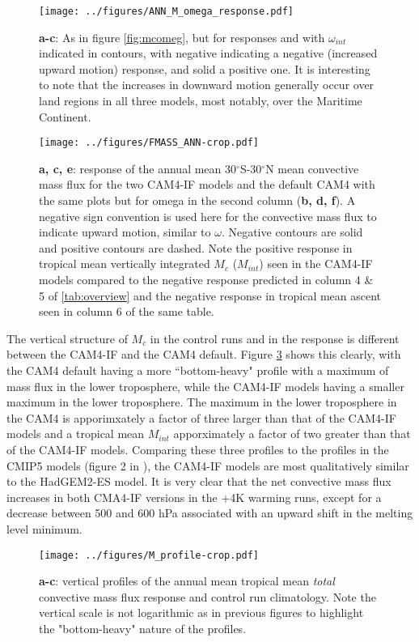 \documentclass[letterpaper,12pt,titlepage,oneside,final]{book}
\begin{document}
\begin{figure}[H]
\centering
\noindent\texttt{[image: ../figures/ANN\_M\_omega\_response.pdf]}\hfill
\caption{\textbf{a-c}: As in figure \ref{fig:mcomeg}, but for responses and with $\omega_{int}$ indicated in contours, with negative indicating a negative (increased upward motion) response, and solid a positive one. It is interesting to note that the increases in downward motion generally occur over land regions in all three models, most notably, over the Maritime Continent.}
\label{fig:mcomegres}
\end{figure}
\begin{figure}[H]
\centering
\noindent\texttt{[image: ../figures/FMASS\_ANN-crop.pdf]}\hfill
\caption{\textbf{a, c, e}: response of the annual mean 30$^\circ$S-30$^\circ$N mean convective mass flux for the two CAM4-IF models and the default CAM4 with the same plots but for omega in the second column (\textbf{b, d, f}). A negative sign convention is used here for the convective mass flux to indicate upward motion, similar to $\omega$. Negative contours are solid and positive contours are dashed. Note the positive response in tropical mean vertically integrated $M_c$ ($M_{int}$) seen in the CAM4-IF models compared to the negative response predicted in column 4 \& 5 of \ref{tab:overview} and the negative response in tropical mean ascent seen in column 6 of the same table. }
\label{fig:Mc}
\end{figure}
The vertical structure of $M_{c}$ in the control runs and in the response is different between the CAM4-IF and the CAM4 default. Figure \ref{fig:mprofs} shows this clearly, with the CAM4 default having a more ``bottom-heavy" profile with a maximum of mass flux in the lower troposphere, while the CAM4-IF models having a smaller maximum in the lower troposphere. The maximum in the lower troposphere in the CAM4 is apporimxately a factor of three larger than that of the CAM4-IF models and a tropical mean $M_{int}$ apporximately a factor of two greater than that of the CAM4-IF models. Comparing these three profiles to the profiles in the CMIP5 models (figure 2 in \cite{chadwick_spatial_2012}), the CAM4-IF models are most qualitatively similar to the HadGEM2-ES model. It is very clear that the net convective mass flux increases in both CMA4-IF versions in the +4K warming runs, except for a decrease between 500 and 600 hPa associated with an upward shift in the melting level minimum.
\begin{figure}[H]
\centering
\noindent\texttt{[image: ../figures/M\_profile-crop.pdf]}\hfill
\caption{\textbf{a-c}: vertical profiles of the annual mean tropical mean \textit{total} convective mass flux response and control run climatology. Note the vertical scale is not logarithmic as in previous figures to highlight the "bottom-heavy" nature of the profiles.}
\label{fig:mprofs}
\end{figure}
\end{document}
